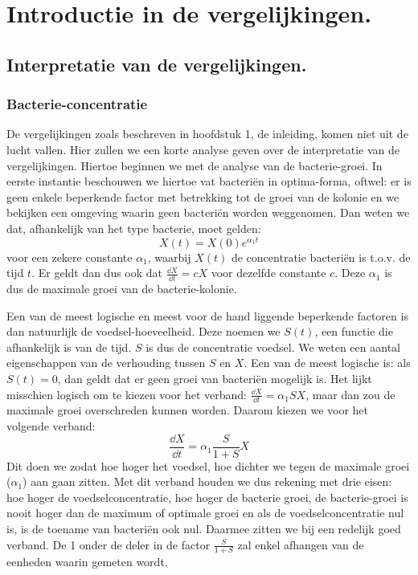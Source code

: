 

\chapter{Introductie in de vergelijkingen.} %


\section{Interpretatie van de vergelijkingen.}

\subsection*{Bacterie-concentratie}
De vergelijkingen zoals beschreven in hoofdstuk 1, de inleiding, komen niet uit de lucht vallen. Hier zullen we een korte analyse geven over de interpretatie van de vergelijkingen. Hiertoe beginnen we met de analyse van de bacterie-groei. In eerste instantie beschouwen we hiertoe vat bacteri\"en in optima-forma, oftwel: er is geen enkele beperkende factor met betrekking tot de groei van de kolonie en we bekijken een omgeving waarin geen bacteri\"en worden weggenomen. Dan weten we dat, afhankelijk van het type bacterie, moet gelden:
\begin{equation*}
	X(t) = X(0) e^{\alpha_1t} 		
\end{equation*}
voor een zekere constante $\alpha_1$, waarbij $X(t)$ de concentratie bacteri\"en is t.o.v. de tijd $t$. Er geldt dan dus ook dat $\tfrac{\dd X}{\dd t} = c X$ voor dezelfde constante $c$. Deze $\alpha_1$ is dus de maximale groei van de bacterie-kolonie. 

Een van de meest logische en meest voor de hand liggende beperkende factoren is dan natuurlijk de voedsel-hoeveelheid. Deze noemen we $S(t)$, een functie die afhankelijk is van de tijd. $S$ is dus de concentratie voedsel. We weten een aantal eigenschappen van de verhouding tussen $S$ en $X$. Een van de meest logische is: als $S(t) = 0$, dan geldt dat er geen groei van bacteri\"en mogelijk is. Het lijkt misschien logisch om te kiezen voor het verband: $\tfrac{\dd X}{\dd t} =  \alpha_1 S X$, maar dan zou de maximale groei overschreden kunnen worden. Daarom kiezen we voor het volgende verband:
\begin{equation*}
	\frac{\dd X} {\dd t} = \alpha_1 \frac{S}{1 + S} X
\end{equation*}
Dit doen we zodat hoe hoger het voedsel, hoe dichter we tegen de maximale groei ($\alpha_1$) aan gaan zitten. Met dit verband houden we dus rekening met drie eisen: hoe hoger de voedselconcentratie, hoe hoger de bacterie groei, de bacterie-groei is nooit hoger dan de maximum of optimale groei en als de voedselconcentratie nul is, is de toename van bacteri\"en ook nul. Daarmee zitten we bij een redelijk goed verband. De 1 onder de deler in de factor $\frac{S}{1+S}$ zal enkel afhangen van de eenheden waarin gemeten wordt. 

